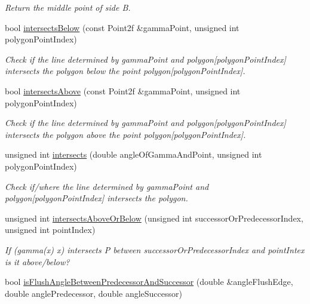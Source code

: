 \begin{DoxyCompactItemize}
\begin{DoxyCompactList}\small\item\em Return the middle point of side B. \end{DoxyCompactList}\item 
bool \hyperlink{classmultiscale_1_1MinEnclosingTriangleFinder_a0abe1c7d5ef5a43f8ea1b404db0066e0}{intersects\-Below} (const Point2f \&gamma\-Point, unsigned int polygon\-Point\-Index)
\begin{DoxyCompactList}\small\item\em Check if the line determined by gamma\-Point and polygon\mbox{[}polygon\-Point\-Index\mbox{]} intersects the polygon below the point polygon\mbox{[}polygon\-Point\-Index\mbox{]}. \end{DoxyCompactList}\item 
bool \hyperlink{classmultiscale_1_1MinEnclosingTriangleFinder_aba0848fcc9021b379fd5f02a6708912d}{intersects\-Above} (const Point2f \&gamma\-Point, unsigned int polygon\-Point\-Index)
\begin{DoxyCompactList}\small\item\em Check if the line determined by gamma\-Point and polygon\mbox{[}polygon\-Point\-Index\mbox{]} intersects the polygon above the point polygon\mbox{[}polygon\-Point\-Index\mbox{]}. \end{DoxyCompactList}\item 
unsigned int \hyperlink{classmultiscale_1_1MinEnclosingTriangleFinder_a586e3fde222d1464eb57a3e20ceb136c}{intersects} (double angle\-Of\-Gamma\-And\-Point, unsigned int polygon\-Point\-Index)
\begin{DoxyCompactList}\small\item\em Check if/where the line determined by gamma\-Point and polygon\mbox{[}polygon\-Point\-Index\mbox{]} intersects the polygon. \end{DoxyCompactList}\item 
unsigned int \hyperlink{classmultiscale_1_1MinEnclosingTriangleFinder_a622303a315704ffb0e262ec66f2a07fb}{intersects\-Above\-Or\-Below} (unsigned int successor\-Or\-Predecessor\-Index, unsigned int point\-Index)
\begin{DoxyCompactList}\small\item\em If (gamma(x) x) intersects P between successor\-Or\-Predecessor\-Index and point\-Intex is it above/below? \end{DoxyCompactList}\item 
bool \hyperlink{classmultiscale_1_1MinEnclosingTriangleFinder_a067f421f84dfd1803c241efc85dbc0bb}{is\-Flush\-Angle\-Between\-Predecessor\-And\-Successor} (double \&angle\-Flush\-Edge, double angle\-Predecessor, double angle\-Successor)

\end{DoxyCompactItemize}

